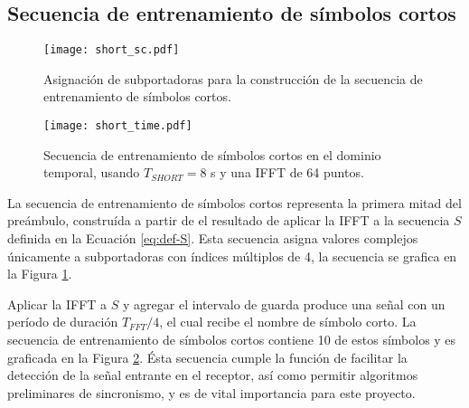 \subsection{Secuencia de entrenamiento de símbolos cortos}
\label{Ss:ch2-short}

\begin{figure}[t]
    \centering{}\texttt{[image: short\_sc.pdf]}
    \caption{Asignación de subportadoras para la construcción de la secuencia de entrenamiento de símbolos cortos.\label{fig:short-sc}}  
\end{figure}
\begin{figure}[t]
    \centering{}\texttt{[image: short\_time.pdf]}
    \caption{Secuencia de entrenamiento de símbolos cortos en el dominio temporal, usando $T_{SHORT} = 8$ \textmu s y una IFFT de 64 puntos.\label{fig:short-time}}  
\end{figure}

La secuencia de entrenamiento de símbolos cortos representa la primera mitad del preámbulo, construída a partir de el resultado de aplicar la IFFT a la secuencia $S$ definida en la Ecuación \ref{eq:def-S}. Esta secuencia asigna valores complejos únicamente a subportadoras con índices múltiplos de 4, la secuencia se grafica en la Figura \ref{fig:short-sc}.

Aplicar la IFFT a $S$ y agregar el intervalo de guarda produce una señal con un período de duración $T_{FFT}/4$, el cual recibe el nombre de símbolo corto. La secuencia de entrenamiento de símbolos cortos contiene 10 de estos símbolos y es graficada en la Figura \ref{fig:short-time}. Ésta secuencia cumple la función de facilitar la detección de la señal entrante en el receptor, así como permitir algoritmos preliminares de sincronismo, y es de vital importancia para este proyecto.

